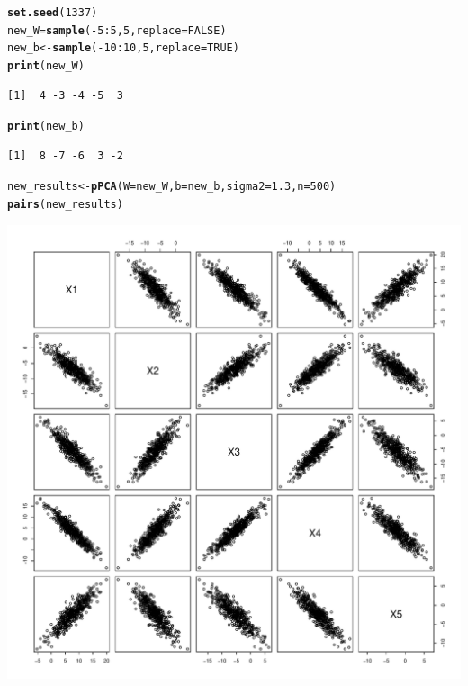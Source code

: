 \documentclass[10pt, a4paper, english]{article}\usepackage[]{graphicx}\usepackage[dvipsnames]{xcolor}
\makeatletter
\def\maxwidth{ %
  \ifdim\Gin@nat@width>\linewidth
    \linewidth
  \else
    \Gin@nat@width
  \fi
}
\newcommand{\hlnum}[1]{\textcolor[rgb]{0.686,0.059,0.569}{#1}}%
\newcommand{\hlopt}[1]{\textcolor[rgb]{0,0,0}{#1}}%
\newcommand{\hlstd}[1]{\textcolor[rgb]{0.345,0.345,0.345}{#1}}%
\newcommand{\hlkwb}[1]{\textcolor[rgb]{0.69,0.353,0.396}{#1}}%
\newcommand{\hlkwc}[1]{\textcolor[rgb]{0.333,0.667,0.333}{#1}}%
\newcommand{\hlkwd}[1]{\textcolor[rgb]{0.737,0.353,0.396}{\textbf{#1}}}%
\newenvironment{kframe}{%
 \def\at@end@of@kframe{}%
 \ifinner\ifhmode%
  \def\at@end@of@kframe{\end{minipage}}%
  \begin{minipage}{\columnwidth}%
 \fi\fi%
 \def\FrameCommand##1{\hskip\@totalleftmargin \hskip-\fboxsep
 \colorbox{shadecolor}{##1}\hskip-\fboxsep
     \hskip-\linewidth \hskip-\@totalleftmargin \hskip\columnwidth}%
 \MakeFramed {\advance\hsize-\width
   \@totalleftmargin\z@ \linewidth\hsize
   \@setminipage}}%
 {\par\unskip\endMakeFramed%
 \at@end@of@kframe}
\newenvironment{knitrout}{}{} %
\makeatother
\begin{document}
\begin{knitrout}
\color{fgcolor}\begin{kframe}
\begin{alltt}
\hlkwd{set.seed}\hlstd{(}\hlnum{1337}\hlstd{)}
\hlstd{new_W} \hlkwb{=} \hlkwd{sample}\hlstd{(}\hlopt{-}\hlnum{5}\hlopt{:}\hlnum{5}\hlstd{,} \hlnum{5}\hlstd{,} \hlkwc{replace}\hlstd{=}\hlnum{FALSE}\hlstd{)}
\hlstd{new_b} \hlkwb{<-} \hlkwd{sample}\hlstd{(}\hlopt{-}\hlnum{10}\hlopt{:}\hlnum{10}\hlstd{,} \hlnum{5}\hlstd{,} \hlkwc{replace}\hlstd{=}\hlnum{TRUE}\hlstd{)}
\hlkwd{print}\hlstd{(new_W)}
\end{alltt}
\begin{verbatim}
[1]  4 -3 -4 -5  3
\end{verbatim}
\begin{alltt}
\hlkwd{print}\hlstd{(new_b)}
\end{alltt}
\begin{verbatim}
[1]  8 -7 -6  3 -2
\end{verbatim}
\begin{alltt}
\hlstd{new_results}  \hlkwb{<-} \hlkwd{pPCA}\hlstd{(}\hlkwc{W} \hlstd{= new_W,} \hlkwc{b} \hlstd{= new_b,} \hlkwc{sigma2} \hlstd{=} \hlnum{1.3}\hlstd{,} \hlkwc{n}\hlstd{=}\hlnum{500}\hlstd{)}
\hlkwd{pairs}\hlstd{(new_results)}
\end{alltt}
\end{kframe}
\includegraphics[width=\maxwidth]{figure/unnamed-chunk-21-1} 
\end{knitrout}
\end{document}
